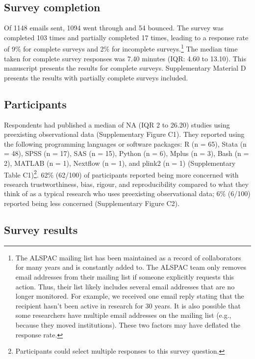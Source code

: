 \documentclass[
  man,floatsintext]{apa6}
\begin{document}
\hypertarget{survey-completion}{%
\subsection{Survey completion}\label{survey-completion}}

Of 1148 emails sent, 1094 went through and 54 bounced. The survey was completed 103 times and partially completed 17 times, leading to a response rate of 9\% for complete surveys and 2\% for incomplete surveys.\footnote[1]{The ALSPAC mailing list has been maintained as a record of collaborators for many years and is constantly added to. The ALSPAC team only removes email addresses from their mailing list if someone explicitly requests this action. Thus, their list likely includes several email addresses that are no longer monitored. For example, we received one email reply stating that the recipient hasn’t been active in research for 30 years. It is also possible that some researchers have multiple email addresses on the mailing list (e.g., because they moved institutions). These two factors may have deflated the response rate.} The median time taken for complete survey responses was 7.40 minutes (IQR: 4.60 to 13.10). This manuscript presents the results for complete surveys. Supplementary Material D presents the results with partially complete surveys included.

\hypertarget{participants-1}{%
\subsection{Participants}\label{participants-1}}

Respondents had published a median of NA (IQR 2 to 26.20) studies using preexisting observational data (Supplementary Figure C1). They reported using the following programming languages or software packages: R (n = 65), Stata (n = 48), SPSS (n = 17), SAS (n = 15), Python (n = 6), Mplus (n = 3), Bash (n = 2), MATLAB (n = 1), Nextflow (n = 1), and plink2 (n = 1) (Supplementary Table C1)\footnote[2]{Participants could select multiple responses to this survey question.}. 62\% (62/100) of participants reported being more concerned with research trustworthiness, bias, rigour, and reproducibility compared to what they think of as a typical research who uses preexisting observational data; 6\% (6/100) reported being less concerned (Supplementary Figure C2).

\hypertarget{survey-results}{%
\subsection{Survey results}\label{survey-results}}
\end{document}
